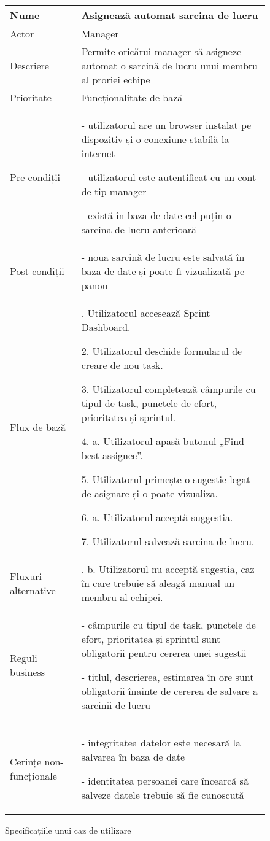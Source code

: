 \begin{figure}[H]
	\centering
\begin{tabularx}{\textwidth} { 
  | >{\raggedright\arraybackslash}p{}
  | >{\raggedright\arraybackslash}p{} | }

 \hline
Nume &  Asignează automat sarcina de lucru\\
 \hline
Actor &  Manager \\
\hline
Descriere &  Permite oricărui manager să asigneze automat o sarcină de lucru unui membru al proriei echipe \\
\hline
Prioritate &  Funcționalitate de bază \\
\hline
Pre-condiții & - utilizatorul are un browser instalat pe dispozitiv și o conexiune stabilă la internet

- utilizatorul este autentificat cu un cont de tip manager

- există în baza de date cel puțin o sarcina de lucru anterioară  \\
\hline
Post-condiții & - noua sarcină de lucru este salvată în baza de date și poate fi vizualizată pe panou \\
\hline
Flux de bază & 1. Utilizatorul accesează Sprint Dashboard.

2. Utilizatorul deschide formularul de creare de nou task.

3. Utilizatorul completează câmpurile cu tipul de task, punctele de efort, prioritatea și sprintul.

4. a. Utilizatorul apasă butonul „Find best assignee”.

5. Utilizatorul primește o sugestie legat de asignare și o poate vizualiza.

6. a. Utilizatorul acceptă suggestia.

7. Utilizatorul salvează sarcina de lucru.\\
\hline
Fluxuri alternative & 6. b. Utilizatorul nu acceptă sugestia, caz în care trebuie să aleagă manual un membru al echipei.\\
\hline
Reguli business & - câmpurile cu tipul de task, punctele de efort, prioritatea și sprintul sunt obligatorii pentru cererea unei sugestii

- titlul, descrierea, estimarea în ore sunt obligatorii înainte de cererea de salvare a sarcinii de lucru\\
\hline
Cerințe non-funcționale & - integritatea datelor este necesară la salvarea în baza de date

- identitatea persoanei care încearcă să salveze datele trebuie să fie cunoscută\\
\hline
\end{tabularx}
	\caption{Specificațiile unui caz de utilizare}
	\label{fig:usecase-table}
\end{figure}
